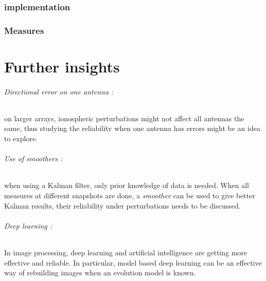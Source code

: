 \documentclass[titlepage]{article}
\begin{document}
	\section{implementation}
	\section{Measures}
	
	\newpage
	\part{Further insights}
	
	
	\paragraph{Directional error on one antenna :} on larger arrays, ionospheric perturbations might not affect all antennas the same, thus studying the reliability when one antenna has errors might be an idea to explore.
	
	\paragraph{Use of smoothers :} when using a Kalman filter, only prior knowledge of data is needed. When all measures at different snapshots are done, a \emph{smoother}\cite{RTS} can be used to give better Kalman results, their reliability under perturbations needs to be discussed. 
	
	\paragraph{Deep learning :} In image processing, deep learning and artificial intelligence are getting more effective and reliable. In particular, model based deep learning \cite{deep} can be an effective way of rebuilding images when an evolution model is known.
	
	\newpage
	\printbibliography
\end{document}
